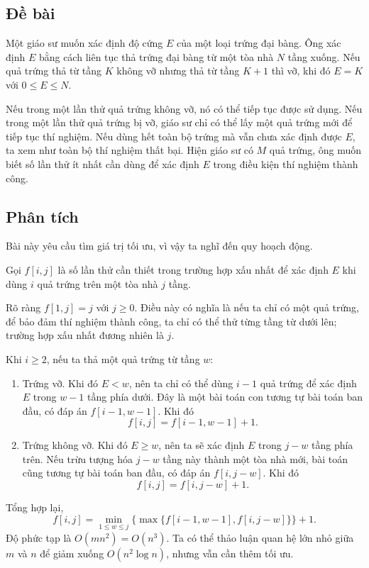 \documentclass[11pt]{article}
\begin{document}
\subsection*{Đề bài}

Một giáo sư muốn xác định độ cứng $E$ của một loại trứng đại bàng. Ông xác
định $E$ bằng cách liên tục thả trứng đại bàng từ một tòa nhà $N$ tầng xuống.
Nếu quả trứng thả từ tầng $K$ không vỡ nhưng thả từ tầng $K+1$ thì vỡ, khi đó
$E=K$ với $0\le E\le N$.

Nếu trong một lần thử quả trứng không vỡ, nó có thể tiếp tục được sử dụng.
Nếu trong một lần thử quả trứng bị vỡ, giáo sư chỉ có thể lấy một quả trứng
mới để tiếp tục thí nghiệm. Nếu dùng hết toàn bộ trứng mà vẫn chưa xác định
được $E$, ta xem như toàn bộ thí nghiệm thất bại. Hiện giáo sư có $M$ quả
trứng, ông muốn biết số lần thử ít nhất cần dùng để xác định $E$ trong điều
kiện thí nghiệm thành công.

\subsection*{Phân tích}

Bài này yêu cầu tìm giá trị tối ưu, vì vậy ta nghĩ đến quy hoạch động.

Gọi $f[i,j]$ là số lần thử cần thiết trong trường hợp xấu nhất để xác định
$E$ khi dùng $i$ quả trứng trên một tòa nhà $j$ tầng.

Rõ ràng $f[1,j]=j$ với $j\ge 0$. Điều này có nghĩa là nếu ta chỉ có một quả
trứng, để bảo đảm thí nghiệm thành công, ta chỉ có thể thử từng tầng từ dưới
lên; trường hợp xấu nhất đương nhiên là $j$.

Khi $i\ge 2$, nếu ta thả một quả trứng từ tầng $w$:

\begin{enumerate}
  \item Trứng vỡ. Khi đó $E<w$, nên ta chỉ có thể dùng $i-1$ quả trứng để xác
  định $E$ trong $w-1$ tầng phía dưới. Đây là một bài toán con tương tự bài
  toán ban đầu, có đáp án $f[i-1,w-1]$. Khi đó
  \[
    f[i,j]=f[i-1,w-1]+1.
  \]

  \item Trứng không vỡ. Khi đó $E\ge w$, nên ta sẽ xác định $E$ trong $j-w$
  tầng phía trên. Nếu trừu tượng hóa $j-w$ tầng này thành một tòa nhà mới,
  bài toán cũng tương tự bài toán ban đầu, có đáp án $f[i,j-w]$. Khi đó
  \[
    f[i,j]=f[i,j-w]+1.
  \]
\end{enumerate}

Tổng hợp lại,
\[
  f[i,j]=\min_{1\le w\le j}
    \{\max\{f[i-1,w-1],f[i,j-w]\}\}+1.
\]
Độ phức tạp là $O(mn^2)=O(n^3)$. Ta có thể thảo luận quan hệ lớn nhỏ giữa $m$
và $n$ để giảm xuống $O(n^2\log n)$, nhưng vẫn cần thêm tối ưu.
\end{document}
